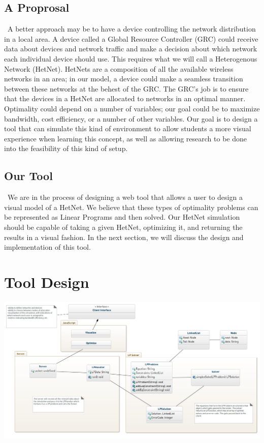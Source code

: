 \documentclass[11pt]{article}
\begin{document}
\subsection{A Proprosal}
~\indent A better approach may be to have a device controlling the network distribution
in a local area. A device called a Global Resource Controller (GRC) could receive
data about devices and network traffic and make a decision about which network
each individual device should use. This requires what we will call a Heterogenous 
Network (HetNet). HetNets are a composition of all the available wireless 
networks in an area; in our model, a device could make a seamless transition
between these networks at the behest of the GRC. The GRC's job is to ensure 
that the devices in a HetNet are allocated to networks in an optimal manner.
Optimality could depend on a number of variables; our goal could be to maximize
bandwidth, cost efficiency, or a number of other variables. Our goal is 
to design a tool that can simulate this kind of environment to allow students 
a more visual experience when learning this concept, as well as allowing research
to be done into the feasibility of this kind of setup.

\subsection{Our Tool}
~\indent We are in the process of designing a web tool that allows a user to design a 
visual model of a HetNet. We believe that these types of optimality problems
can be represented as Linear Programs and then solved. Our HetNet simulation
should be capable of taking a given HetNet, optimizing it, and returning the 
results in a visual fashion. In the next section, we will discuss the 
design and implementation of this tool.


\section{Tool Design}

\begin{center}
\includegraphics[width=600px, angle=270]{model.png}
\end{center}
\end{document}
